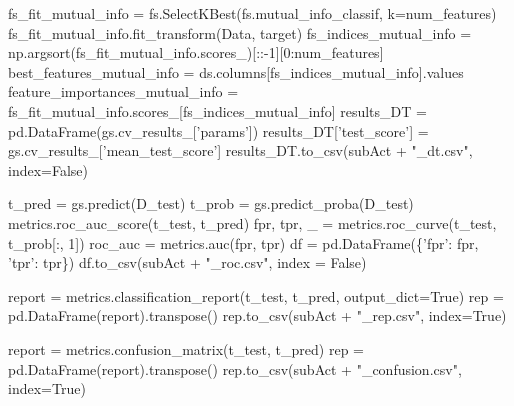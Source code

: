 \documentclass[11pt,]{article}
\newenvironment{Shaded}{\begin{snugshade}}{\end{snugshade}}
\newcommand{\DecValTok}[1]{\textcolor[rgb]{0.69,0.50,0.00}{#1}}
\newcommand{\NormalTok}[1]{\textcolor[rgb]{0.12,0.11,0.11}{#1}}
\newcommand{\OperatorTok}[1]{\textcolor[rgb]{0.12,0.11,0.11}{#1}}
\newcommand{\StringTok}[1]{\textcolor[rgb]{0.75,0.01,0.01}{#1}}
\newcommand{\VariableTok}[1]{\textcolor[rgb]{0.00,0.34,0.68}{#1}}
\begin{document}
\begin{Shaded}
\begin{Highlighting}[]
\NormalTok{    fs_fit_mutual_info }\OperatorTok{=}\NormalTok{ fs.SelectKBest(fs.mutual_info_classif, k}\OperatorTok{=}\NormalTok{num_features)}
\NormalTok{    fs_fit_mutual_info.fit_transform(Data, target)}
\NormalTok{    fs_indices_mutual_info }\OperatorTok{=}\NormalTok{ np.argsort(fs_fit_mutual_info.scores_)[::}\OperatorTok{-}\DecValTok{1}\NormalTok{][}\DecValTok{0}\NormalTok{:num_features]}
\NormalTok{    best_features_mutual_info }\OperatorTok{=}\NormalTok{ ds.columns[fs_indices_mutual_info].values    }
\NormalTok{    feature_importances_mutual_info }\OperatorTok{=}\NormalTok{ fs_fit_mutual_info.scores_[fs_indices_mutual_info]}
\NormalTok{    results_DT }\OperatorTok{=}\NormalTok{ pd.DataFrame(gs.cv_results_[}\StringTok{'params'}\NormalTok{])}
\NormalTok{    results_DT[}\StringTok{'test_score'}\NormalTok{] }\OperatorTok{=}\NormalTok{ gs.cv_results_[}\StringTok{'mean_test_score'}\NormalTok{]}
\NormalTok{    results_DT.to_csv(subAct }\OperatorTok{+} \StringTok{"_dt.csv"}\NormalTok{, index}\OperatorTok{=}\VariableTok{False}\NormalTok{)}
    
\NormalTok{    t_pred }\OperatorTok{=}\NormalTok{ gs.predict(D_test)}
\NormalTok{    t_prob }\OperatorTok{=}\NormalTok{ gs.predict_proba(D_test)}
\NormalTok{    metrics.roc_auc_score(t_test, t_pred)}
\NormalTok{    fpr, tpr, _ }\OperatorTok{=}\NormalTok{ metrics.roc_curve(t_test, t_prob[:, }\DecValTok{1}\NormalTok{])}
\NormalTok{    roc_auc }\OperatorTok{=}\NormalTok{ metrics.auc(fpr, tpr)    }
\NormalTok{    df }\OperatorTok{=}\NormalTok{ pd.DataFrame(\{}\StringTok{'fpr'}\NormalTok{: fpr, }\StringTok{'tpr'}\NormalTok{: tpr\})}
\NormalTok{    df.to_csv(subAct }\OperatorTok{+} \StringTok{"_roc.csv"}\NormalTok{, index }\OperatorTok{=} \VariableTok{False}\NormalTok{)}
    
\NormalTok{    report }\OperatorTok{=}\NormalTok{ metrics.classification_report(t_test, t_pred, output_dict}\OperatorTok{=}\VariableTok{True}\NormalTok{)}
\NormalTok{    rep }\OperatorTok{=}\NormalTok{ pd.DataFrame(report).transpose()}
\NormalTok{    rep.to_csv(subAct }\OperatorTok{+} \StringTok{"_rep.csv"}\NormalTok{, index}\OperatorTok{=}\VariableTok{True}\NormalTok{)}
    
\NormalTok{    report }\OperatorTok{=}\NormalTok{ metrics.confusion_matrix(t_test, t_pred)}
\NormalTok{    rep }\OperatorTok{=}\NormalTok{ pd.DataFrame(report).transpose()}
\NormalTok{    rep.to_csv(subAct }\OperatorTok{+} \StringTok{"_confusion.csv"}\NormalTok{, index}\OperatorTok{=}\VariableTok{True}\NormalTok{)    }
\end{Highlighting}
\end{Shaded}
\end{document}
